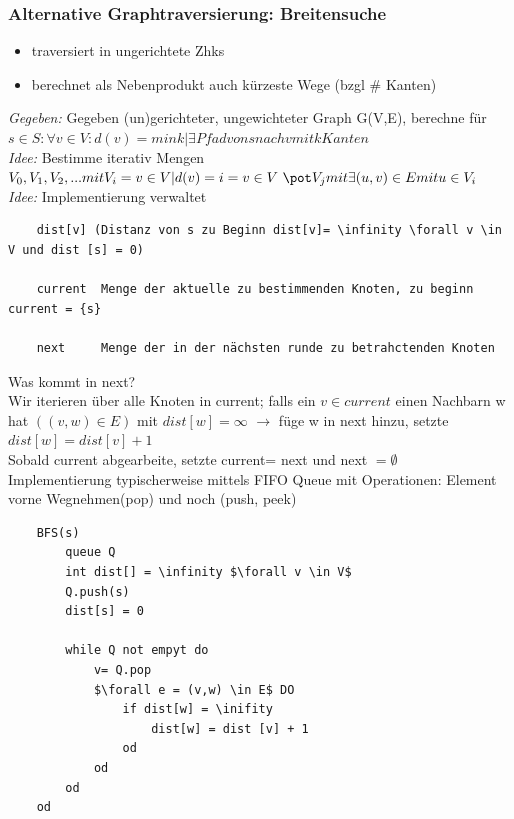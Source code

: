 \documentclass{article}
\begin{document}
\subsubsection{Alternative Graphtraversierung: Breitensuche}
\begin{itemize}
    \item traversiert in ungerichtete Zhks
    \item berechnet als Nebenprodukt auch kürzeste Wege (bzgl # Kanten)
\end{itemize}
\textit{Gegeben: } Gegeben (un)gerichteter, ungewichteter Graph G(V,E), berechne für $ s \in S: \forall v \in V: d(v) = min {k | \exists Pfad von s nach v mit k Kanten} $ \\
\textit{Idee: } Bestimme iterativ Mengen $V_0 , V_1 , V_2, ...  mit V_i = { v \in V | d(v) =  i} = {v \in V \ \pot V_j mit \exists (u,v) \in E mit u \in V_i } $ \\
\textit{Idee: } Implementierung verwaltet 
\begin{verbatim}
    dist[v] (Distanz von s zu Beginn dist[v]= \infinity \forall v \in V und dist [s] = 0)

    current  Menge der aktuelle zu bestimmenden Knoten, zu beginn current = {s}

    next     Menge der in der nächsten runde zu betrahctenden Knoten
\end{verbatim}
Was kommt in next?\\
Wir iterieren über alle Knoten in current; falls ein $ v \in current$ einen Nachbarn w hat $((v,w) \in E) $ mit $ dist[w]= \infty $
$\rightarrow$ füge w in next hinzu, setzte $ dist[w] = dist [v] + 1$ \\
Sobald current abgearbeite, setzte current= next und next $= \emptyset $ \\  
\newline 
Implementierung typischerweise mittels FIFO  Queue mit Operationen: Element vorne Wegnehmen(pop) und noch (push, peek)


\begin{verbatim}
    BFS(s)
        queue Q
        int dist[] = \infinity $\forall v \in V$
        Q.push(s)
        dist[s] = 0

        while Q not empyt do
            v= Q.pop
            $\forall e = (v,w) \in E$ DO
                if dist[w] = \inifity
                    dist[w] = dist [v] + 1
                od
            od
        od
    od
\end{verbatim}
\end{document}
